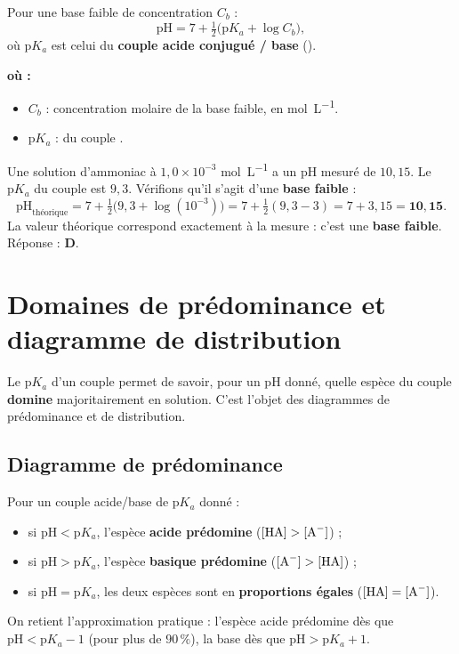\documentclass[11pt,a4paper]{article}
\newenvironment{ou}{%
  \par\smallskip\noindent\textbf{où :}\nopagebreak
  \begin{itemize}[leftmargin=1.8em,topsep=2pt,itemsep=1.5pt,parsep=0pt]}%
  {\end{itemize}}
\begin{document}
\begin{formule}
Pour une base faible  de concentration $C_b$ :
\[ \boxed{\mathrm{pH} = 7 + \tfrac{1}{2}\bigl(\mathrm{p}K_a + \log C_b\bigr)}, \]
où $\mathrm{p}K_a$ est celui du \textbf{couple acide conjugué / base} ().
\end{formule}

\begin{ou}
\item $C_b$ : concentration molaire de la base faible, en \si{mol.L^{-1}}.
\item $\mathrm{p}K_a$ : du couple .
\end{ou}

\begin{exemple}
Une solution d'ammoniac  à $1{,}0\times10^{-3}$ \si{mol.L^{-1}} a un pH mesuré de $10{,}15$. Le
$\mathrm{p}K_a$ du couple  est $9{,}3$. Vérifions qu'il s'agit d'une \textbf{base faible} :
\[ \mathrm{pH}_{\text{théorique}} = 7 + \tfrac{1}{2}\bigl(9{,}3 + \log(10^{-3})\bigr) = 7 + \tfrac{1}{2}(9{,}3 - 3) = 7 + 3{,}15 = \mathbf{10{,}15}. \]
La valeur théorique correspond exactement à la mesure : c'est une \textbf{base faible}. Réponse : \textbf{D}.
\end{exemple}

\section{Domaines de prédominance et diagramme de distribution}
Le $\mathrm{p}K_a$ d'un couple  permet de savoir, pour un pH donné, quelle espèce du couple
\textbf{domine} majoritairement en solution. C'est l'objet des diagrammes de prédominance et de distribution.

\subsection{Diagramme de prédominance}

\begin{regle}
Pour un couple acide/base de $\mathrm{p}K_a$ donné :
\begin{itemize}[leftmargin=1.6em,topsep=2pt,itemsep=2pt]
  \item si $\mathrm{pH} < \mathrm{p}K_a$, l'espèce \textbf{acide  prédomine} ($[\ce{HA}] > [\ce{A-}]$) ;
  \item si $\mathrm{pH} > \mathrm{p}K_a$, l'espèce \textbf{basique  prédomine} ($[\ce{A-}] > [\ce{HA}]$) ;
  \item si $\mathrm{pH} = \mathrm{p}K_a$, les deux espèces sont en \textbf{proportions égales}
        ($[\ce{HA}] = [\ce{A-}]$).
\end{itemize}
On retient l'approximation pratique : l'espèce acide prédomine dès que $\mathrm{pH} < \mathrm{p}K_a - 1$
(pour plus de $90\,\%$), la base dès que $\mathrm{pH} > \mathrm{p}K_a + 1$.
\end{regle}
\end{document}
